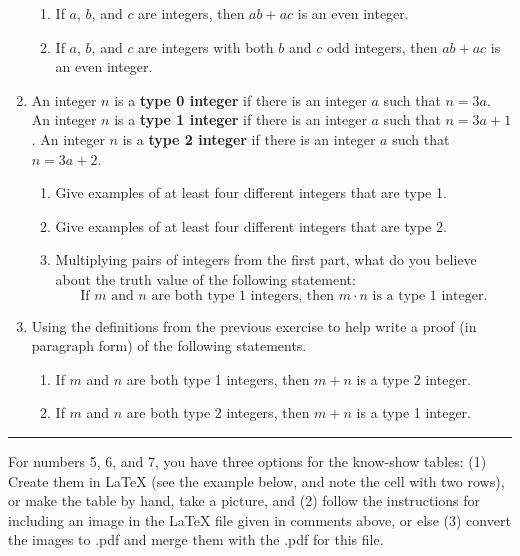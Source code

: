 \documentclass[12pt]{article}
\begin{document}
\begin{enumerate}
 \begin{enumerate}
   \item
     If $a$, $b$, and $c$ are integers, then $ab + ac$ is an even integer.
   \item
     If  $a$, $b$, and $c$ are integers with both  $b$ and $c$ odd integers, then $ab + ac$ is an even integer.
 \end{enumerate}


\item  An integer $n$ is a {\bf type 0 integer} if there is an integer $a$ such that $n=3a$.
       An integer $n$ is a {\bf type 1 integer} if there is an integer $a$ such that $n=3a+1$.
       An integer $n$ is a {\bf type 2 integer} if there is an integer $a$ such that $n=3a+2$.
  
 \begin{enumerate}
   \item Give examples of at least four different integers that are type 1.
   \item Give examples of at least four different integers that are type 2.
   \item Multiplying pairs of integers from the first part, what do you believe about the truth value of the following statement:
     \[  \mbox{If $m$ and $n$ are both type 1 integers, then $m\cdot n$ is a type 1 integer.} \]
 \end{enumerate}


\item  Using the definitions from the previous exercise to help write a proof (in paragraph form) of the following statements.
  
 \begin{enumerate}
   \item  If $m$ and $n$ are both type 1 integers, then $m+n$ is a type 2 integer.
   \item  If $m$ and $n$ are both type 2 integers, then $m+n$ is a type 1 integer.
 \end{enumerate}


\end{enumerate}

\noindent\hrule\smallskip

For numbers 5, 6, and 7, you have three options for the  know-show tables: (1) Create them in LaTeX (see the example below, and note the
cell with two rows),  or make the table by hand, take a picture, and (2) follow the instructions for including an image in the LaTeX
file given in comments above, or else (3) convert the images to .pdf  and merge them with the .pdf for this file.
\end{document}
